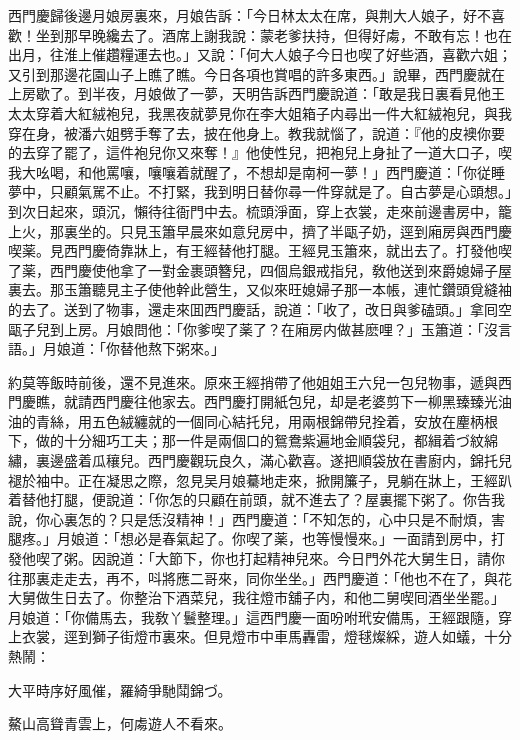 西門慶歸後邊月娘房裏來，月娘告訴：「今日林太太在席，與荆大人娘子，好不喜歡！坐到那早晚纔去了。酒席上謝我說：蒙老爹扶持，但得好䖏，不敢有忘！也在出月，往淮上催趲糧運去也。」又說：「何大人娘子今日也喫了好些酒，喜歡六姐；又引到那邊花園山子上瞧了瞧。今日各項也賞唱的許多東西。」說畢，西門慶就在上房歇了。到半夜，月娘做了一夢，天明告訴西門慶說道：「敢是我日裏看見他王太太穿着大紅絨袍兒，我黑夜就夢見你在李大姐箱子内尋出一件大紅絨袍兒，與我穿在身，被潘六姐劈手奪了去，披在他身上。教我就惱了，說道：『他的皮襖你要的去穿了罷了，這件袍兒你又來奪！』他使性兒，把袍兒上身扯了一道大口子，喫我大吆喝，和他罵嚷，嚷嚷着就醒了，不想却是南柯一夢！」西門慶道：「你従睡夢中，只顧氣駡不止。不打緊，我到明日替你尋一件穿就是了。自古夢是心頭想。」到次日起來，頭沉，懶待往衙門中去。梳頭淨面，穿上衣裳，走來前邊書房中，籠上火，那裏坐的。只見玉簫早晨來如意兒房中，擠了半甌子奶，逕到廂房與西門慶喫薬。見西門慶倚靠牀上，有王經替他打腿。王經見玉簫來，就出去了。打發他喫了薬，西門慶使他拿了一對金裹頭簪兒，四個烏銀戒指兒，敎他送到來爵媳婦子屋裏去。那玉簫聽見主子使他幹此營生，又似來旺媳婦子那一本帳，連忙鑽頭覓縫袖的去了。送到了物事，還走來囬西門慶話，說道：「收了，改日與爹磕頭。」拿囘空甌子兒到上房。月娘問他：「你爹喫了薬了？在廂房内做甚麽哩？」玉簫道：「沒言語。」月娘道：「你替他熬下粥來。」

約莫等飯時前後，還不見進來。原來王經捎帶了他姐姐王六兒一包兒物事，遞與西門慶瞧，就請西門慶往他家去。西門慶打開紙包兒，却是老婆剪下一柳黑臻臻光油油的青絲，用五色絨纏就的一個同心結托兒，用兩根錦帶兒拴着，安放在麈柄根下，做的十分細巧工夫；那一件是兩個口的鴛鴦紫遍地金順袋兒，都緝着づ紋綿繡，裏邊盛着瓜穰兒。西門慶觀玩良久，滿心歡喜。遂把順袋放在書廚内，錦托兒褪於袖中。正在凝思之際，忽見吴月娘驀地走來，掀開簾子，見躺在牀上，王經趴着替他打腿，便說道：「你怎的只顧在前頭，就不進去了？屋裏擺下粥了。你告我說，你心裏怎的？只是恁沒精神！」西門慶道：「不知怎的，心中只是不耐煩，害腿疼。」月娘道：「想必是春氣起了。你喫了薬，也等慢慢來。」一面請到房中，打發他喫了粥。因說道：「大節下，你也打起精神兒來。今日門外花大舅生日，請你往那裏走走去，再不，呌將應二哥來，同你坐坐。」西門慶道：「他也不在了，與花大舅做生日去了。你整治下酒菜兒，我往燈巿舖子内，和他二舅喫囘酒坐坐罷。」月娘道：「你備馬去，我敎丫鬟整理。」這西門慶一面吩咐玳安備馬，王經跟隨，穿上衣裳，逕到獅子街燈巿裏來。但見燈巿中車馬轟雷，燈毬燦綵，遊人如蟻，十分熱鬧：

\begin{myquote}
大平時序好風催，羅綺爭馳鬦錦づ。

鰲山高聳青雲上，何䖏遊人不看來。
\end{myquote}

